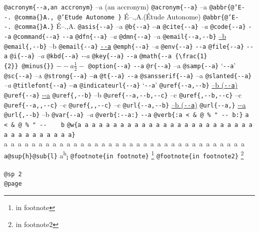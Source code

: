 \documentclass{book}
\newcommand\Texinfocommandstyletextcite[1]{{\normalfont{}\textsl{#1}}}%
\newcommand\Texinfocommandstyletextkbd[1]{{\ttfamily\textsl{#1}}}%
\newcommand\Texinfocommandstyletextvar[1]{{\normalfont{}\textsl{#1}}}%
\renewcommand{\_}{\Texinfounderscore\discretionary{}{}{}}
\begin{document}
\begin{titlepage}
{\texttt{@acronym\{{-}{-}a,an accronym\}} --a (an accronym)
\texttt{@acronym\{{-}{-}a\}} --a
\texttt{@abbr\{@'E{-}{-}.\ @comma\{\}A.,\ @'Etude Autonome \}} \'{E}--.\@ ,A.\@ (\'{E}tude Autonome)
\texttt{@abbr\{@'E{-}{-}.\ @comma\{\}A.\}} \'{E}--.\@ ,A.\@
\texttt{@asis\{{-}{-}a\}} --a
\texttt{@b\{{-}{-}a\}} \textbf{--a}
\texttt{@cite\{{-}{-}a\}} \Texinfocommandstyletextcite{--a}
\texttt{@code\{{-}{-}a\}} \texttt{{-}{-}a}
\texttt{@command\{{-}{-}a\}} \texttt{{-}{-}a}
\texttt{@dfn\{{-}{-}a\}} \textsl{--a}
\texttt{@dmn\{{-}{-}a\}} \thinspace --a
\texttt{@email\{{-}{-}a,{-}{-}b\}} \href{mailto:--a}{--b}
\texttt{@email\{,{-}{-}b\}} --b
\texttt{@email\{{-}{-}a\}} \href{mailto:--a}{\nolinkurl{--a}}
\texttt{@emph\{{-}{-}a\}} \emph{--a}
\texttt{@env\{{-}{-}a\}} \texttt{{-}{-}a}
\texttt{@file\{{-}{-}a\}} \texttt{{-}{-}a}
\texttt{@i\{{-}{-}a\}} \textit{--a}
\texttt{@kbd\{{-}{-}a\}} \Texinfocommandstyletextkbd{{-}{-}a}
\texttt{@key\{{-}{-}a\}} \texttt{{-}{-}a}
\texttt{@math\{{-}{-}a \{\textbackslash{}frac\{1\}\{2\}\}\ @minus\{\}\}} $--a {\frac{1}{2}} -$
\texttt{@option\{{-}{-}a\}} \texttt{{-}{-}a}
\texttt{@r\{{-}{-}a\}} \textnormal{--a}
\texttt{@samp\{{-}{-}a\}} `\texttt{{-}{-}a}'
\texttt{@sc\{{-}{-}a\}} \textsc{--a}
\texttt{@strong\{{-}{-}a\}} \textbf{--a}
\texttt{@t\{{-}{-}a\}} \texttt{{-}{-}a}
\texttt{@sansserif\{{-}{-}a\}} \textsf{--a}
\texttt{@slanted\{{-}{-}a\}} \textsl{--a}
\texttt{@titlefont\{{-}{-}a\}} {\huge \bfseries --a}
\texttt{@indicateurl\{{-}{-}a\}} `\texttt{{-}{-}a}'
\texttt{@uref\{{-}{-}a,{-}{-}b\}} \href{--a}{--b (\nolinkurl{--a})}
\texttt{@uref\{{-}{-}a\}} \url{--a}
\texttt{@uref\{,{-}{-}b\}} --b
\texttt{@uref\{{-}{-}a,{-}{-}b,{-}{-}c\}} --c
\texttt{@uref\{,{-}{-}b,{-}{-}c\}} --c
\texttt{@uref\{{-}{-}a{,}{,}{-}{-}c\}} --c
\texttt{@uref\{{,}{,}{-}{-}c\}} --c
\texttt{@url\{{-}{-}a,{-}{-}b\}} \href{--a}{--b (\nolinkurl{--a})}
\texttt{@url\{{-}{-}a,\}} \url{--a}
\texttt{@url\{,{-}{-}b\}} --b
\texttt{@var\{{-}{-}a\}} \Texinfocommandstyletextvar{--a}
\texttt{@verb\{:{-}{-}a:\}} \verb:--a:
\texttt{@verb\{:a  < \& @\ \% " {-}{-}    b:\}} \verb:a  < & @ % " --    b:
\texttt{@w\{a a a a a a a a a a a a a a a a a a a a a a a a a a a a a a a a a a a\}} \hbox{a a a a a a a a a a a a a a a a a a a a a a a a a a a a a a a a a a a}
\texttt{a@sup\{h\}@sub\{l\}} a\textsuperscript{h}\textsubscript{l}
\texttt{@footnote\{in footnote\}} \footnote{in footnote}
\texttt{@footnote\{in footnote2\}} \footnote{in footnote2}

\texttt{@sp 2}\leavevmode{}\\
\baselineskip %
\texttt{@page}\leavevmode{}\\
\newpage{}%
\phantom{blabla}%

}
\end{titlepage}
\end{document}
